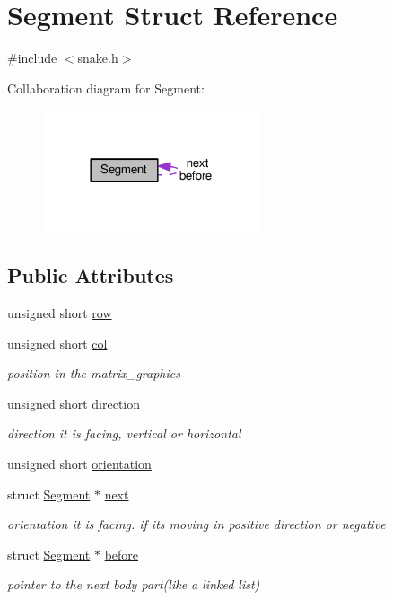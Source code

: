 \hypertarget{structSegment}{}\section{Segment Struct Reference}
\label{structSegment}


{\ttfamily \#include $<$snake.\+h$>$}



Collaboration diagram for Segment\+:
\nopagebreak
\begin{figure}[H]
\begin{center}
\leavevmode
\includegraphics[width=182pt]{structSegment__coll__graph}
\end{center}
\end{figure}
\subsection*{Public Attributes}
\begin{DoxyCompactItemize}
\item 
unsigned short \hyperlink{group__snake_ga5c86edfec316ae4d5033a85525babed6}{row}
\item 
unsigned short \hyperlink{group__snake_ga3369387554e0ec37bb04c153c3529ed9}{col}
\begin{DoxyCompactList}\small\item\em position in the matrix\+\_\+graphics \end{DoxyCompactList}\item 
unsigned short \hyperlink{group__snake_gacf610091b7f59fb0f1f37c6df4e14c18}{direction}
\begin{DoxyCompactList}\small\item\em direction it is facing, vertical or horizontal \end{DoxyCompactList}\item 
unsigned short \hyperlink{group__snake_gadd6c62d3fd2c3aab9175c07694fdc075}{orientation}
\item 
struct \hyperlink{structSegment}{Segment} $\ast$ \hyperlink{group__snake_ga20fb1741f720a656ec35972c2305a2d9}{next}
\begin{DoxyCompactList}\small\item\em orientation it is facing. if its moving in positive direction or negative \end{DoxyCompactList}\item 
struct \hyperlink{structSegment}{Segment} $\ast$ \hyperlink{group__snake_ga60c4d032ff0baffc3c99c1630dae24e3}{before}
\begin{DoxyCompactList}\small\item\em pointer to the next body part(like a linked list) \end{DoxyCompactList}\end{DoxyCompactItemize}


